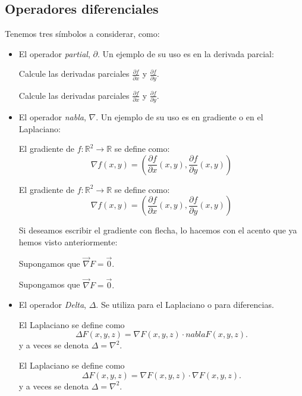 \documentclass[graybox,envcountchap,sectrefs]{svmono}
\begin{document}
    \subsection{Operadores diferenciales}
    Tenemos tres símbolos a considerar, como:
    \begin{itemize}
        \item El operador \emph{partial}, \(\partial\). Un ejemplo de su uso 
            es en la derivada parcial:
            \begin{code}
                Calcule las derivadas parciales \(\frac{\partial f}{\partial x}\)
                y \(\frac{\partial f}{\partial y}\).
            \end{code}
            \begin{compiled}
                Calcule las derivadas parciales \(\frac{\partial f}{\partial x}\) y \(\frac{\partial f}{\partial y}\).
            \end{compiled}

        \item El operador \emph{nabla}, \(\nabla\).
        Un ejemplo de su uso es en gradiente o en el Laplaciano:
            \begin{code}
                El gradiente de \(f:\mathbb{R}^2\to \mathbb{R}\)
                se define como:
                    \[\nabla f(x,y) = \left( \frac{\partial f}{\partial x}(x,y), \frac{\partial f}{\partial y}(x,y) \right) \]
            \end{code}
            \begin{compiled}
                El gradiente de \(f:\mathbb{R}^2\to \mathbb{R}\)
                se define como:
                    \[\nabla f(x,y) = \left( \frac{\partial f}{\partial x}(x,y), \frac{\partial f}{\partial y}(x,y) \right) \]
            \end{compiled}
            Si deseamos escribir el gradiente con flecha, lo hacemos con el acento que ya hemos visto anteriormente:
            \begin{code}
                Supongamos que \(\vec{\nabla} F = \vec{0}.\)
            \end{code}
            \begin{compiled}
                Supongamos que \(\vec{\nabla} F = \vec{0}.\)
            \end{compiled}

        \item El operador \emph{Delta}, \(\Delta\). Se utiliza para el Laplaciano o para diferencias.
            \begin{code}
                El Laplaciano se define como
                \[\Delta F(x,y,z) = \nabla F(x,y,z)\cdot nabla F(x,y,z).\]
                y a veces se denota \(\Delta=\nabla ^2\).
            \end{code}
            \begin{compiled}
                El Laplaciano se define como
                \[\Delta F(x,y,z) = \nabla F(x,y,z)\cdot \nabla F(x,y,z).\]
                y a veces se denota \(\Delta=\nabla ^2\).
            \end{compiled}
    \end{itemize}
\end{document}

